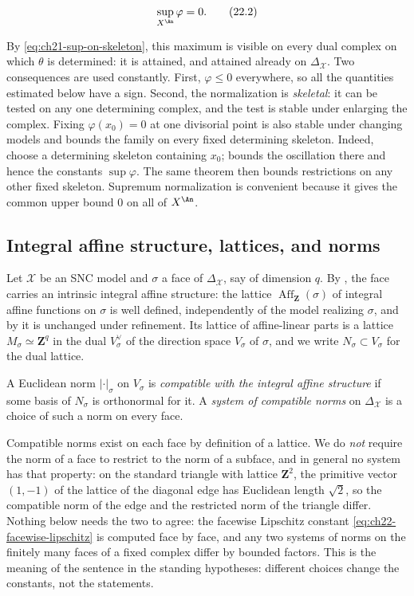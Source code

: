 \[
                         \sup_{X^{\An}}\varphi=0.
\tag{22.2}\label{eq:ch22-normalization}
\]

By \eqref{eq:ch21-sup-on-skeleton}, this maximum is visible on every dual
complex on which $\theta$ is determined: it is attained, and attained
already on $\Delta_{\mathcal X}$.  Two consequences are used constantly.
First, $\varphi\leq0$ everywhere, so all the quantities estimated below
have a sign.  Second, the normalization is \emph{skeletal}: it can be tested
on any one determining complex, and the test is stable under enlarging the
complex.  Fixing $\varphi(x_0)=0$ at one divisorial point is also stable
under changing models and bounds the family on every fixed determining
skeleton.  Indeed, choose a determining skeleton containing $x_0$;
 bounds the oscillation there and hence
the constants $\sup\varphi$.  The same theorem then bounds restrictions on
any other fixed skeleton.  Supremum normalization is convenient because it
gives the common upper bound $0$ on all of $X^{\An}$.

\subsection{Integral affine structure, lattices, and norms}

Let $\mathcal X$ be an SNC model and $\sigma$ a face of
$\Delta_{\mathcal X}$, say of dimension $q$.  By
, the face carries
an intrinsic integral affine structure: the lattice
$\operatorname{Aff}_{\mathbf Z}(\sigma)$ of integral affine functions on
$\sigma$ is well defined, independently of the model realizing
$\sigma$, and by  it is unchanged
under refinement.  Its lattice of affine-linear parts is a lattice
$M_\sigma\simeq\mathbf Z^q$ in the dual $V_\sigma^\vee$ of the direction
space $V_\sigma$ of $\sigma$, and we write
$N_\sigma\subset V_\sigma$ for the dual lattice.

\begin{definition}
\label{def:ch22-compatible-norm}
A Euclidean norm $|\cdot|_\sigma$ on $V_\sigma$ is \emph{compatible with
the integral affine structure} if some basis of $N_\sigma$ is orthonormal
for it.  A \emph{system of compatible norms} on $\Delta_{\mathcal X}$ is a
choice of such a norm on every face.
\end{definition}

Compatible norms exist on each face by definition of a lattice.  We do
\emph{not} require the norm of a face to restrict to the norm of a subface,
and in general no system has that property: on the standard triangle with
lattice $\mathbf Z^2$, the primitive vector $(1,-1)$ of the lattice of
the diagonal edge has Euclidean length $\sqrt2$, so the compatible norm of
the edge and the restricted norm of the triangle differ.  Nothing below
needs the two to agree: the facewise Lipschitz constant
\eqref{eq:ch22-facewise-lipschitz} is computed face by face, and any two
systems of norms on the finitely many faces of a fixed complex differ by
bounded factors.  This is the meaning of the sentence in the standing
hypotheses: different choices change the constants, not the statements.

